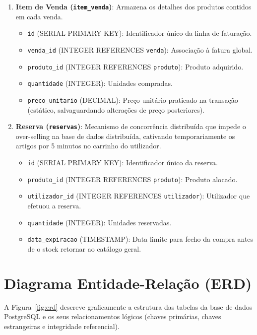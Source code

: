 \documentclass[11pt,a4paper,oneside]{report}
\begin{document}
\begin{enumerate}
    \item \textbf{Item de Venda (\texttt{item\_venda})}: Armazena os detalhes dos produtos contidos em cada venda.
    \begin{itemize}
        \item \texttt{id} (SERIAL PRIMARY KEY): Identificador único da linha de faturação.
        \item \texttt{venda\_id} (INTEGER REFERENCES \texttt{venda}): Associação à fatura global.
        \item \texttt{produto\_id} (INTEGER REFERENCES \texttt{produto}): Produto adquirido.
        \item \texttt{quantidade} (INTEGER): Unidades compradas.
        \item \texttt{preco\_unitario} (DECIMAL): Preço unitário praticado na transação (estático, salvaguardando alterações de preço posteriores).
    \end{itemize}

    \item \textbf{Reserva (\texttt{reservas})}: Mecanismo de concorrência distribuída que impede o over-selling na base de dados distribuída, cativando temporariamente os artigos por 5 minutos no carrinho do utilizador.
    \begin{itemize}
        \item \texttt{id} (SERIAL PRIMARY KEY): Identificador único da reserva.
        \item \texttt{produto\_id} (INTEGER REFERENCES \texttt{produto}): Produto alocado.
        \item \texttt{utilizador\_id} (INTEGER REFERENCES \texttt{utilizador}): Utilizador que efetuou a reserva.
        \item \texttt{quantidade} (INTEGER): Unidades reservadas.
        \item \texttt{data\_expiracao} (TIMESTAMP): Data limite para fecho da compra antes de o stock retornar ao catálogo geral.
    \end{itemize}
\end{enumerate}

\section{Diagrama Entidade-Relação (ERD)}
A Figura~\ref{fig:erd} descreve graficamente a estrutura das tabelas da base de dados PostgreSQL e os seus relacionamentos lógicos (chaves primárias, chaves estrangeiras e integridade referencial).
\end{document}
